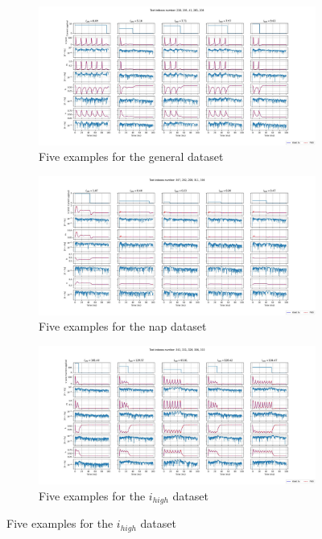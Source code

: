 \documentclass{article}
\begin{document}
\begin{center}
    \begin{figure}
        \begin{subfigure}{.5\textwidth}
            \centering
            \includegraphics[width=1.8\linewidth]{images/general_error_HH.jpg}
            \caption{Five examples for the general dataset}
            \label{HH_err_general}
        \end{subfigure}

        \begin{subfigure}{.5\textwidth}
            \centering
            \includegraphics[width=1.8\linewidth]{images/nap_error_HH.jpg}
            \caption{Five examples for the nap dataset}
            \label{HH_err_nap}
        \end{subfigure}

        \begin{subfigure}{.5\textwidth}
            \centering
            \includegraphics[width=1.8\linewidth]{images/high_i_error_HH.jpg}
            \caption{Five examples for the $i_{high}$ dataset}
            \label{HH_err_t_f}
        \end{subfigure}
    \end{figure}
\end{center}
\end{document}
